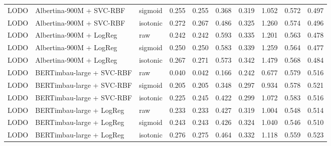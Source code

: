 \begin{table}[t]
\begin{tabular}{lllrrrrrrr}
LODO & Albertina-900M + SVC-RBF & sigmoid & 0.255 & 0.255 & 0.368 & 0.319 & 1.052 & 0.572 & 0.497 \\
LODO & Albertina-900M + SVC-RBF & isotonic & 0.272 & 0.267 & 0.486 & 0.325 & 1.260 & 0.574 & 0.496 \\
LODO & Albertina-900M + LogReg & raw & 0.242 & 0.242 & 0.593 & 0.335 & 1.201 & 0.563 & 0.478 \\
LODO & Albertina-900M + LogReg & sigmoid & 0.250 & 0.250 & 0.583 & 0.339 & 1.259 & 0.564 & 0.477 \\
LODO & Albertina-900M + LogReg & isotonic & 0.267 & 0.271 & 0.573 & 0.342 & 1.479 & 0.568 & 0.484 \\
LODO & BERTimbau-large + SVC-RBF & raw & 0.040 & 0.042 & 0.166 & 0.242 & 0.677 & 0.579 & 0.516 \\
LODO & BERTimbau-large + SVC-RBF & sigmoid & 0.205 & 0.205 & 0.348 & 0.297 & 0.934 & 0.578 & 0.521 \\
LODO & BERTimbau-large + SVC-RBF & isotonic & 0.225 & 0.245 & 0.422 & 0.299 & 1.072 & 0.583 & 0.516 \\
LODO & BERTimbau-large + LogReg & raw & 0.233 & 0.233 & 0.427 & 0.319 & 1.004 & 0.548 & 0.514 \\
LODO & BERTimbau-large + LogReg & sigmoid & 0.243 & 0.243 & 0.426 & 0.324 & 1.040 & 0.546 & 0.510 \\
LODO & BERTimbau-large + LogReg & isotonic & 0.276 & 0.275 & 0.464 & 0.332 & 1.118 & 0.559 & 0.523 \\
\bottomrule
\end{tabular}
\end{table}
